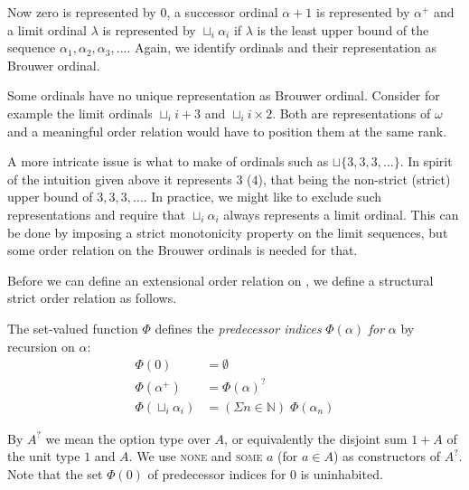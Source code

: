 Now zero is represented by $0$, a successor ordinal $\alpha +1$ is represented
by $\alpha^+$ and a limit ordinal $\lambda$ is represented by $\sqcup_i
\alpha_i$ if $\lambda$ is the least upper bound of the sequence $\alpha_1,
\alpha_2, \alpha_3, \ldots$. %
Again, we identify ordinals and their representation as Brouwer ordinal.

Some ordinals have no unique representation as Brouwer ordinal. Consider for
example the limit ordinals $\sqcup_i i + 3$ and $\sqcup_i i \times 2$. Both
are representations of $\omega$ and a meaningful order relation would
have to position them at the same rank.

A more intricate issue is what to make of ordinals such as $\sqcup \{ 3, 3, 3,
\ldots \}$. In spirit of the intuition given above it represents $3$ ($4$),
that being the non-strict (strict) upper bound of $3, 3, 3, \ldots$.
In practice, we might like to exclude such representations and require that
$\sqcup_i \alpha_i$ always represents a limit ordinal. This can be done by
imposing a strict monotonicity property on the limit sequences, but some order
relation on the Brouwer ordinals is needed for that.


Before we can define an extensional order relation on \Ord, we define a
structural strict order relation as follows.

\begin{definition}%
The set-valued function $\Phi$ defines the \emph{predecessor indices} $\Phi(\alpha)$
\emph{for} $\alpha$ by recursion on $\alpha$:
\begin{align*}
  \Phi(0)                 &= \emptyset \\
  \Phi(\alpha^+)          &= \Phi(\alpha)^? \\
  \Phi(\sqcup_i \alpha_i) &= (\Sigma n \in \mathbb{N}) \; \Phi(\alpha_n)
\end{align*}
\end{definition}

By $A^?$ we mean the option type over $A$, or equivalently the disjoint sum
$1 + A$ of the unit type $1$ and $A$. We use \textsc{none} and \textsc{some
  $a$} (for $a \in A$) as constructors of $A^?$. Note that the set
$\Phi(0)$ of predecessor indices for $0$ is uninhabited.

